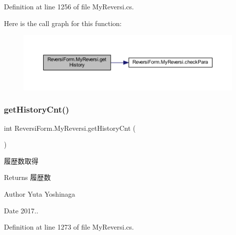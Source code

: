 Definition at line 1256 of file My\+Reversi.\+cs.

Here is the call graph for this function\+:\nopagebreak
\begin{figure}[H]
\begin{center}
\leavevmode
\includegraphics[width=350pt]{class_reversi_form_1_1_my_reversi_a249dba624bda1144c23cc53f68c35c67_cgraph}
\end{center}
\end{figure}
\mbox{\label{class_reversi_form_1_1_my_reversi_a400dc82a921060bfdcf97a5fee721be1}} 
\subsubsection{\texorpdfstring{get\+History\+Cnt()}{getHistoryCnt()}}
{\footnotesize\ttfamily int Reversi\+Form.\+My\+Reversi.\+get\+History\+Cnt (\begin{DoxyParamCaption}{ }\end{DoxyParamCaption})}



履歴数取得 

\begin{DoxyReturn}{Returns}
履歴数 
\end{DoxyReturn}
\begin{DoxyAuthor}{Author}
Yuta Yoshinaga 
\end{DoxyAuthor}
\begin{DoxyDate}{Date}
2017.. 
\end{DoxyDate}


Definition at line 1273 of file My\+Reversi.\+cs.

\mbox{\label{class_reversi_form_1_1_my_reversi_ab6498c154199b58c418af1e0058736f6}} 
